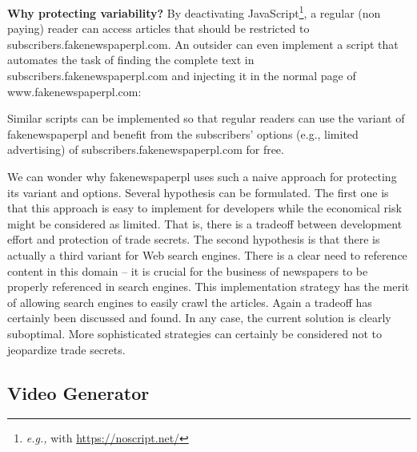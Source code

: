 \documentclass{sig-alternate}
\newcommand\fakenewspaper[0]{fakenewspaperpl\xspace}
\newcommand{\eg}{\emph{e.g.,}\xspace}
\newcommand{\wprv}[0]{\emph{Why variability should be protected?}\xspace}
\renewcommand{\wprv}[0]{\textbf{Why protecting variability?}\xspace}
\begin{document}
\wprv
By deactivating JavaScript\footnote{\eg with \url{https://noscript.net/}}, a regular (non paying) reader can  access articles that should be restricted to subscribers.\fakenewspaper.com. 
An outsider can even implement a script that automates the task of finding the complete text in subscribers.\fakenewspaper.com and injecting it in the normal page of www.\fakenewspaper.com:
 
Similar scripts can be implemented so that regular readers can use the variant of \fakenewspaper and benefit from the subscribers' options (e.g., limited advertising) of subscribers.\fakenewspaper.com  for free. 

We can wonder why \textsf{\fakenewspaper} uses such a naive approach for protecting its variant and options. 
Several hypothesis can be formulated. The first one is that this approach is easy to implement for developers while the economical risk might be considered as limited. That is, there is a tradeoff between development effort and protection of trade secrets. 
The second hypothesis is that there is actually a third variant for Web search engines. There is a clear need to reference content in this domain -- it is crucial for the business of newspapers to be properly referenced in search engines. This implementation strategy has the merit of allowing search engines to easily crawl the articles. 
Again a tradeoff has certainly been discussed and found. In any case, the current solution is clearly suboptimal. 
More sophisticated strategies can certainly be considered not to jeopardize trade secrets. 


\vspace*{-2mm}
\subsection{Video Generator}
\label{sec:casestudy2}
%
\end{document}
